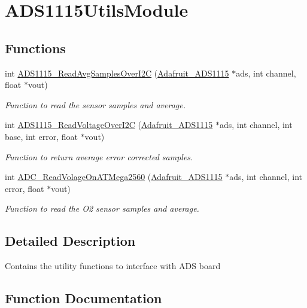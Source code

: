 \hypertarget{group___a_d_s1115_utils_module}{}\section{A\+D\+S1115\+Utils\+Module}
\label{group___a_d_s1115_utils_module}
\subsection*{Functions}
\begin{DoxyCompactItemize}
\item 
int \hyperlink{group___a_d_s1115_utils_module_gaa714b102f0e19f887c62e649837d0a49}{A\+D\+S1115\+\_\+\+Read\+Avg\+Samples\+Over\+I2C} (\hyperlink{class_adafruit___a_d_s1115}{Adafruit\+\_\+\+A\+D\+S1115} $\ast$ads, int channel, float $\ast$vout)
\begin{DoxyCompactList}\small\item\em Function to read the sensor samples and average. \end{DoxyCompactList}\item 
int \hyperlink{group___a_d_s1115_utils_module_ga13fe4c2cc4af35c9b669c71657ce6d8d}{A\+D\+S1115\+\_\+\+Read\+Voltage\+Over\+I2C} (\hyperlink{class_adafruit___a_d_s1115}{Adafruit\+\_\+\+A\+D\+S1115} $\ast$ads, int channel, int base, int error, float $\ast$vout)
\begin{DoxyCompactList}\small\item\em Function to return average error corrected samples. \end{DoxyCompactList}\item 
int \hyperlink{group___a_d_s1115_utils_module_ga9d55217c77d457c52c8d10dec9239066}{A\+D\+C\+\_\+\+Read\+Volage\+On\+A\+T\+Mega2560} (\hyperlink{class_adafruit___a_d_s1115}{Adafruit\+\_\+\+A\+D\+S1115} $\ast$ads, int channel, int error, float $\ast$vout)
\begin{DoxyCompactList}\small\item\em Function to read the O2 sensor samples and average. \end{DoxyCompactList}\end{DoxyCompactItemize}


\subsection{Detailed Description}
Contains the utility functions to interface with A\+DS board 

\subsection{Function Documentation}
\mbox{\label{group___a_d_s1115_utils_module_ga9d55217c77d457c52c8d10dec9239066}} 
